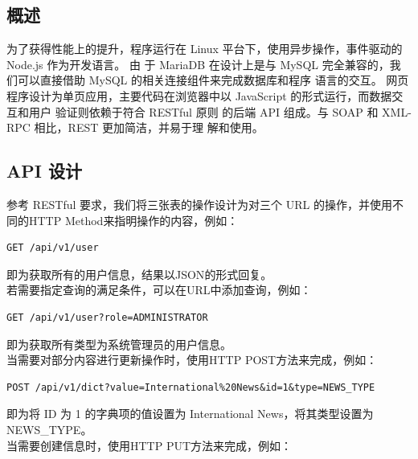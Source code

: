 \documentclass[a4paper, 12pt]{article}
\begin{document}
	\subsection{\normalfont 概述}

	为了获得性能上的提升，程序运行在 Linux 平台下，使用异步操作，事件驱动的 Node.js 作为开发语言。 由
	于 MariaDB 在设计上是与 MySQL 完全兼容的，我们可以直接借助 MySQL 的相关连接组件来完成数据库和程序
	语言的交互。 网页程序设计为单页应用，主要代码在浏览器中以 JavaScript 的形式运行，而数据交互和用户
	验证则依赖于符合 RESTful 原则 的后端 API 组成。与 SOAP 和 XML-RPC 相比，REST 更加简洁，并易于理
	解和使用。

	\subsection{\normalfont API 设计}

	参考 RESTful 要求，我们将三张表的操作设计为对三个 URL 的操作，并使用不同的{\inlinecode HTTP Method}来指明操作的内容，例如：

	\begin{lstlisting}[language=HTTP, basicstyle=\small\lstfont, showstringspaces=false]
	GET /api/v1/user
	\end{lstlisting}

	即为获取所有的用户信息，结果以{\inlinecode JSON}的形式回复。\\

	若需要指定查询的满足条件，可以在{\inlinecode URL}中添加查询，例如：

	\begin{lstlisting}[language=HTTP, basicstyle=\small\lstfont, showstringspaces=false]
	GET /api/v1/user?role=ADMINISTRATOR
	\end{lstlisting}

	即为获取所有类型为系统管理员的用户信息。\\

	当需要对部分内容进行更新操作时，使用{\inlinecode HTTP POST}方法来完成，例如：

	\begin{lstlisting}[language=HTTP, basicstyle=\small\lstfont, showstringspaces=false]
	POST /api/v1/dict?value=International%20News&id=1&type=NEWS_TYPE
	\end{lstlisting}

	即为将 ID 为 1 的字典项的值设置为 International News，将其类型设置为{\inlinecode NEWS\_TYPE}。\\

	当需要创建信息时，使用{\inlinecode HTTP PUT}方法来完成，例如：
	
\end{document}

